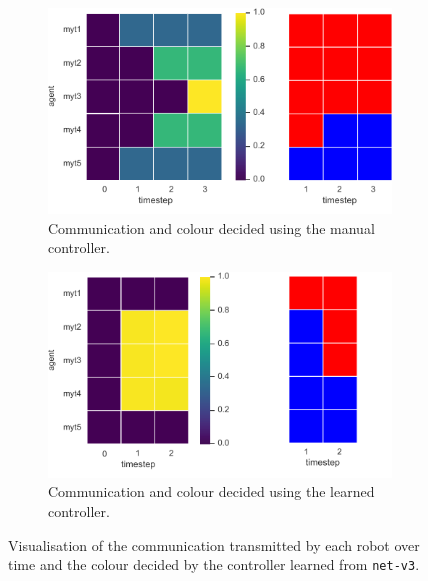 \begin{figure}[!htb]
	\begin{subfigure}[h]{\textwidth}
		\centering
		\includegraphics[width=.55\textwidth]{contents/images/net-v3/net-v3-manual-0(1)}
		\caption{Communication and colour decided using the manual controller.}
	\end{subfigure}
	\hspace*{\fill}%
	\vspace*{8pt}%
	\hspace*{\fill}%
	\begin{subfigure}[h]{\textwidth}
		\centering			
		\includegraphics[width=.55\textwidth]{contents/images/net-v3/net-v3-learned-0(1)}
		\caption{Communication and colour decided using the learned controller.}
	\end{subfigure}
	\caption[Evaluation of the communication learned by 
	\texttt{net-v3}.]{Visualisation of the communication transmitted by each 
		robot over time and the colour decided by the controller learned from 
		\texttt{net-v3}.}	
	\label{fig:net-v3commcolour}
\end{figure}
\vspace{0.5cm}

